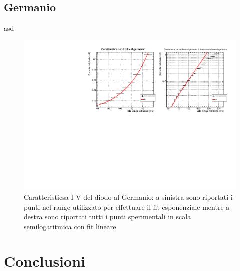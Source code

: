 \documentclass[]{article}
\begin{document}
\subsection{Germanio}
asd
\begin{figure}[H]
	\centering
	\includegraphics[width=1\linewidth]{../Germanio/canvas}
	\caption{Caratteristicsa I-V del diodo al Germanio: a sinistra sono riportati i punti nel range utilizzato per effettuare il fit esponenziale mentre a destra sono riportati tutti i punti sperimentali in scala semilogaritmica con fit lineare}
	\label{fig:germanio}
\end{figure}

\section*{Conclusioni}
\end{document}
